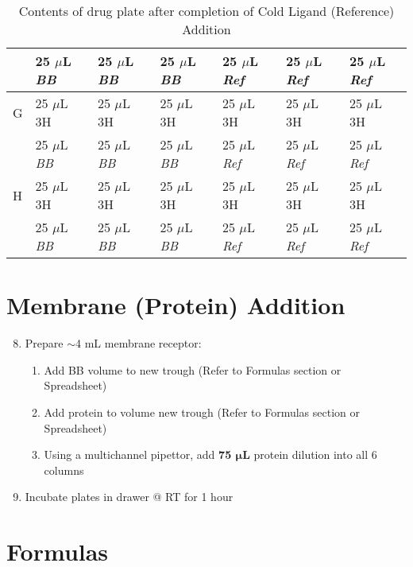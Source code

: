 \documentclass[12pt, letterpaper]{article}
\begin{document}
\begin{table}[h]
\begin{center}
\begin{tabular}{|l|lll|lll|}
        & 25 $\mu$L \emph{BB} & 25 $\mu$L \emph{BB} & 25 $\mu$L \emph{BB} & 25 $\mu$L \emph{Ref} & 25 $\mu$L \emph{Ref} & 25 $\mu$L \emph{Ref} \\ \hline
        G & 25 $\mu$L 3H        & 25 $\mu$L 3H        & 25 $\mu$L 3H        & 25 $\mu$L 3H         & 25 $\mu$L 3H         & 25 $\mu$L 3H         \\
        & 25 $\mu$L \emph{BB} & 25 $\mu$L \emph{BB} & 25 $\mu$L \emph{BB} & 25 $\mu$L \emph{Ref} & 25 $\mu$L \emph{Ref} & 25 $\mu$L \emph{Ref} \\ \hline
        H & 25 $\mu$L 3H        & 25 $\mu$L 3H        & 25 $\mu$L 3H        & 25 $\mu$L 3H         & 25 $\mu$L 3H         & 25 $\mu$L 3H         \\
        & 25 $\mu$L \emph{BB} & 25 $\mu$L \emph{BB} & 25 $\mu$L \emph{BB} & 25 $\mu$L \emph{Ref} & 25 $\mu$L \emph{Ref} & 25 $\mu$L \emph{Ref} \\ \hline
        \end{tabular}
    \caption{Contents of drug plate after completion of Cold Ligand (Reference) Addition}
    \end{center}
\end{table}


\section{Membrane (Protein) Addition}
\begin{enumerate}
    \setcounter{enumi}{7}
    \item Prepare $\sim$4 mL membrane receptor:
    \begin{enumerate}
        \item Add BB volume to new trough (Refer to Formulas section or Spreadsheet)
        \item Add protein to volume new trough (Refer to Formulas section or Spreadsheet)
        \item Using a multichannel pipettor, add \textbf{75 $\bm{\mu}$L} protein dilution into all 6 columns
    \end{enumerate}
    \item Incubate plates in drawer @ RT for 1 hour
\end{enumerate}



\section{Formulas}
\end{document}
